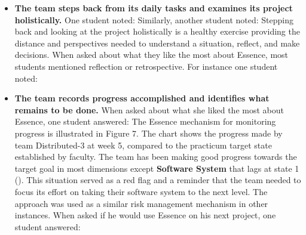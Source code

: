 \begin{itemize}
    \item \textbf{The team steps back from its daily tasks and examines its project holistically.} One student noted:  Similarly, another student noted:  Stepping back and looking at the project holistically is a healthy exercise providing the distance and perspectives needed to understand a situation, reflect, and make decisions. When asked about what they like the most about Essence, most students mentioned reflection or retrospective. For instance one student noted: 
    
    \item \textbf{The team records progress accomplished and identifies what remains to be done.} When asked about what she liked the most about Essence, one student answered:  The Essence mechanism for monitoring progress is illustrated in Figure 7. The chart shows the progress made by team Distributed-3 at week 5, compared to the practicum target state established by faculty. The team has been making good progress towards the target goal in most dimensions except \textbf{Software System} that lags at state 1 (). This situation served as a red flag and a reminder that the team needed to focus its effort on taking their software system to the next level. The approach was used as a similar risk management mechanism in other instances. When asked if he would use Essence on his next project, one student answered: 
    

\end{itemize}

